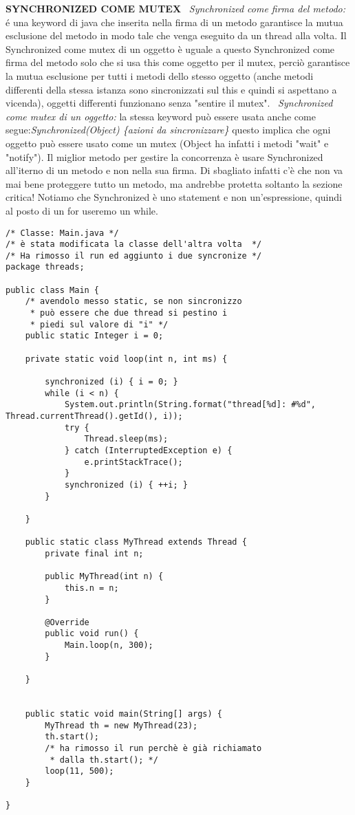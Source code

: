 \noindent \textbf{SYNCHRONIZED COME MUTEX} \newline
\textbullet\ \textit{Synchronized come firma del metodo:} é una keyword di java che inserita nella firma di un metodo garantisce la mutua esclusione del metodo in modo tale che venga eseguito da un thread alla volta. Il Synchronized come mutex di un oggetto è uguale a questo Synchronized come firma del metodo solo che si usa this come oggetto per il mutex, perciò garantisce la mutua esclusione per tutti i metodi dello stesso oggetto (anche metodi differenti della stessa istanza sono sincronizzati sul this e quindi si aspettano a vicenda), oggetti differenti funzionano senza "sentire il mutex".\newline
\textbullet\ \textit{Synchronized come mutex di un oggetto:} la stessa keyword può essere usata anche come segue:\textit{Synchronized(Object) \{azioni da sincronizzare\}} questo implica che ogni oggetto può essere usato come un mutex (Object ha infatti i metodi "wait" e "notify"). \newline
Il miglior metodo per gestire la concorrenza è usare Synchronized all'iterno di un metodo e non nella sua firma. \newline
Di sbagliato infatti c'è che non va mai bene proteggere tutto un metodo, ma andrebbe protetta soltanto la sezione critica!
Notiamo che Synchronized è uno statement e non un'espressione, quindi al posto di un for useremo un while.

\begin{lstlisting}
/* Classe: Main.java */
/* è stata modificata la classe dell'altra volta  */
/* Ha rimosso il run ed aggiunto i due syncronize */
package threads;

public class Main {
	/* avendolo messo static, se non sincronizzo
	 * può essere che due thread si pestino i
	 * piedi sul valore di "i" */ 
    public static Integer i = 0;

    private static void loop(int n, int ms) {

        synchronized (i) { i = 0; }
        while (i < n) {
            System.out.println(String.format("thread[%d]: #%d", Thread.currentThread().getId(), i));
            try {
                Thread.sleep(ms);
            } catch (InterruptedException e) {
                e.printStackTrace();
            }
            synchronized (i) { ++i; }
        }

    }

    public static class MyThread extends Thread {
        private final int n;

        public MyThread(int n) {
            this.n = n;
        }

        @Override
        public void run() {
            Main.loop(n, 300);
        }

    }


    public static void main(String[] args) {
        MyThread th = new MyThread(23);
        th.start();
        /* ha rimosso il run perchè è già richiamato
         * dalla th.start(); */
        loop(11, 500);
    }

}
\end{lstlisting}

